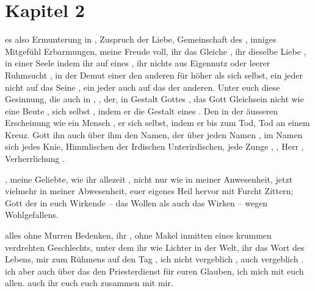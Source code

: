 \section*{Kapitel 2}
 es also  Ermunterung  in ,  Zuspruch der Liebe,  Gemeinschaft des ,  inniges Mitgefühl  Erbarmungen,   meine Freude  voll,  ihr  das Gleiche ,  ihr dieselbe Liebe , in einer Seele   indem ihr auf eines ,  ihr nichts aus Eigennutz oder leerer Ruhmsucht ,  in der Demut einer den anderen für höher  als sich selbst,  ein jeder nicht auf das Seine ,  ein jeder auch auf das der anderen. Unter euch  diese Gesinnung, die auch in , , der,  in Gestalt Gottes , das Gott Gleichsein nicht wie eine Beute ,  sich selbst , indem er die Gestalt eines  . Den    in der äusseren Erscheinung wie ein Mensch ,  er sich selbst, indem er  bis zum Tod,  Tod an einem Kreuz.   Gott ihn auch über    ihm den Namen, der über jeden Namen ,  im Namen  sich  jedes Knie,  Himmlischen der Irdischen  Unterirdischen,  jede Zunge ,  , Herr ,  Verherrlichung .

, meine Geliebte, wie ihr allezeit  , nicht nur wie in meiner Anwesenheit,  jetzt vielmehr in meiner Abwesenheit,  euer eigenes Heil hervor mit Furcht  Zittern;  Gott  der in euch Wirkende --  das Wollen als auch das Wirken -- wegen  Wohlgefallens.

 alles ohne Murren  Bedenken,  ihr   ,  ohne Makel inmitten eines krummen  verdrehten Geschlechts, unter dem ihr  wie Lichter in der Welt,  ihr  das Wort des Lebens, mir zum  Rühmens auf den Tag ,  ich  nicht vergeblich ,  auch vergeblich .  ich aber auch   über das   den Priesterdienst für euren Glauben,  ich mich mit euch allen.   auch ihr euch   euch zusammen mit mir.

